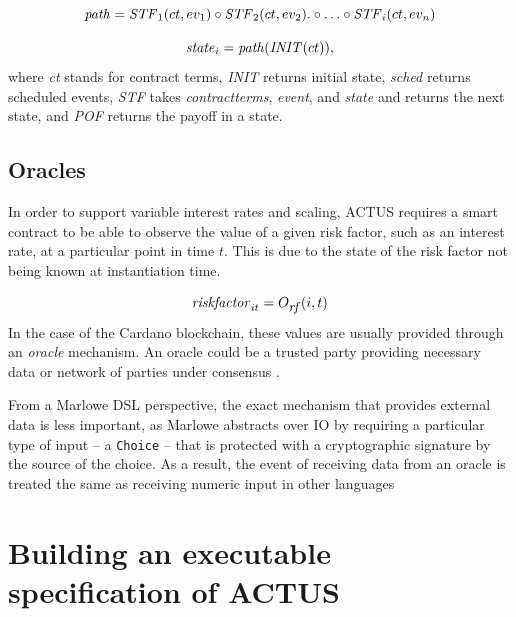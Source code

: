 \documentclass[runningheads]{llncs}
\newcommand{\ident}[1]{\mbox{\emph{#1}}}
\begin{document}
\newcommand{\STF}{\ident{STF}}
\noindent 
\begin{equation}
\ident{path}=\STF_{1}(ct,ev_{1})\circ \STF_{2}(ct,ev_{2}).\circ\ldots\circ \STF_{i}(ct,ev_{n})
\end{equation}

\noindent 
\begin{equation}
\ident{state}_{i}=\ident{path}(\ident{INIT}(ct)),
\end{equation}
\noindent
where \emph{ct} stands for contract terms, \emph{INIT} returns initial state, \emph{sched}
returns scheduled events, \emph{STF} takes \emph{contractterms}, \emph{event}, and \emph{state}
and returns the next state, and \emph{POF} returns the payoff in a state.

\subsection{Oracles}

In order to support variable interest rates and scaling, ACTUS requires
a smart contract to be able to observe the value of a given risk factor,
such as an interest rate, at a particular point in time $t$. This is due to the state of the risk factor not being known at instantiation
time. 

\noindent 
\begin{equation}
\ident{riskfactor}_{it}=O_{\footnotesize\ident{rf}}(i,t)
\end{equation}
\noindent
In the case of the Cardano blockchain, these values are usually
provided through an \emph{oracle} mechanism\cite{oracles}. An oracle
could be a trusted party providing necessary data or network of parties
under consensus \cite{de-oracles}. 

From a Marlowe DSL perspective,
the exact mechanism that provides external data is less important,
as Marlowe abstracts over IO by requiring a particular type of input -- a 
\texttt{Choice} -- that is protected with a cryptographic signature by the source of the choice.
As a result, the event of receiving data from an oracle is treated the
same as receiving numeric input in other languages

\section{Building an executable specification of ACTUS}
\label{executable}
\end{document}
